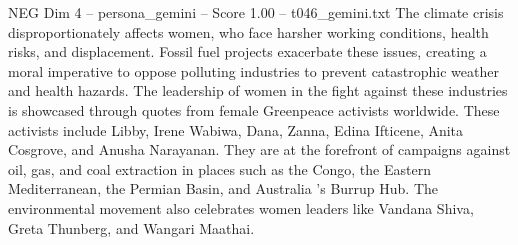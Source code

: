 \begin{textsample}{NEG Dim 4 – persona\_gemini – Score 1.00 – t046\_gemini.txt}  \label{ex:f4_neg_016}
The climate crisis disproportionately affects women, who face harsher working conditions, health risks, and displacement.
Fossil fuel projects exacerbate these issues, creating a moral imperative to oppose polluting industries to prevent catastrophic weather and health hazards.
The leadership of women in the fight against these industries is showcased through quotes from female Greenpeace activists worldwide.
These activists include Libby, Irene Wabiwa, Dana, Zanna, Edina Ifticene, Anita Cosgrove, and Anusha Narayanan.
They are at the forefront of campaigns against oil, gas, and coal extraction in places such as the Congo, the Eastern Mediterranean, the Permian Basin, and Australia 's Burrup Hub.
The environmental movement also celebrates women leaders like Vandana Shiva, Greta Thunberg, and Wangari Maathai.

\end{textsample}
